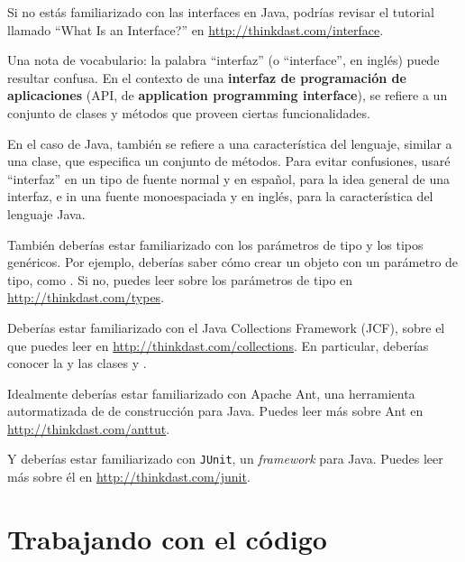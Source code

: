 \documentclass[12pt]{book}
\theoremstyle{exercise}
\begin{document}
Si no estás familiarizado con las interfaces en Java, podrías revisar
el tutorial llamado ``What Is an Interface?'' en
\url{http://thinkdast.com/interface}.


Una nota de vocabulario: la palabra ``interfaz'' (o ``interface'', en inglés) puede resultar
confusa. En el contexto de una {\bf interfaz de programación de aplicaciones} (API, de 
{\bf application programming interface}), se refiere a un conjunto de clases y métodos
que proveen ciertas funcionalidades.


En el caso de Java, también se refiere a una característica del lenguaje,
similar a una clase, que especifica un conjunto de métodos. Para evitar
confusiones, usaré ``interfaz'' en un tipo de fuente normal y en español, para la
idea general de una interfaz, e  in una fuente monoespaciada y en inglés,
para la característica del lenguaje Java.

También deberías estar familiarizado con los parámetros de tipo y los tipos genéricos.
Por ejemplo, deberías saber cómo crear un objeto con un parámetro de tipo, 
como .  Si no, puedes leer sobre los parámetros de tipo
en \url{http://thinkdast.com/types}.


Deberías estar familiarizado con el Java Collections Framework
(JCF), sobre el que puedes leer en
\url{http://thinkdast.com/collections}.
En particular, deberías conocer la  
y las clases  y .


Idealmente deberías estar familiarizado con Apache Ant, una herramienta autormatizada de
de construcción para Java.  Puedes leer más sobre Ant en \url{http://thinkdast.com/anttut}.


Y deberías estar familiarizado con {\tt JUnit}, un \textit{framework} para Java. Puedes
leer más sobre él en \url{http://thinkdast.com/junit}.



\section*{Trabajando con el código}
\label{code}
\end{document}
